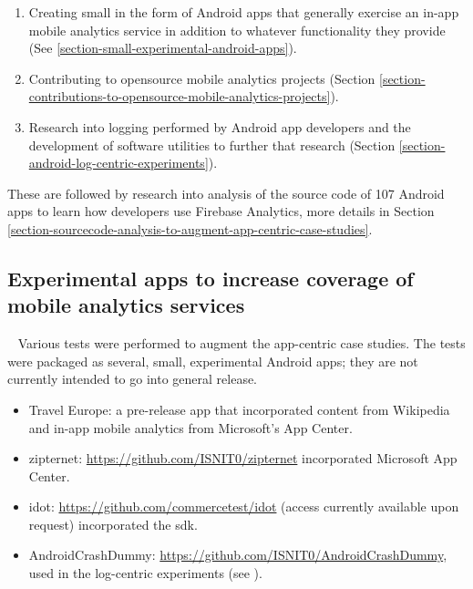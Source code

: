 \begin{enumerate}
    \itemsep0em
    \item Creating small  in the form of Android apps that generally exercise an in-app mobile analytics service in addition to whatever functionality they provide (See \ref{section-small-experimental-android-apps}).
    \item Contributing to opensource mobile analytics projects (Section \ref{section-contributions-to-opensource-mobile-analytics-projects}).
    \item Research into logging performed by Android app developers and the development of software utilities to further that research (Section \ref{section-android-log-centric-experiments}). 
\end{enumerate}

These are followed by research into analysis of the source code of 107 Android apps to learn how developers use Firebase Analytics, more details in Section \ref{section-sourcecode-analysis-to-augment-app-centric-case-studies}.

\subsection{Experimental apps to increase coverage of mobile analytics services}~\label{section-small-experimental-android-apps}
Various tests were performed to augment the app-centric case studies. The tests were packaged as several, small, experimental Android apps; they are not currently intended to go into general release.

\begin{itemize}
    \itemsep0em
    \item Travel Europe: a pre-release app that incorporated content from Wikipedia and in-app mobile analytics from Microsoft's App Center.
    \item zipternet: \url{https://github.com/ISNIT0/zipternet} incorporated Microsoft App Center. %
    \item idot: \url{https://github.com/commercetest/idot} (access currently available upon request) incorporated the  \Gls{sdk}.
    \item AndroidCrashDummy: \url{https://github.com/ISNIT0/AndroidCrashDummy}, used in the log-centric experiments (see ). 
\end{itemize}

